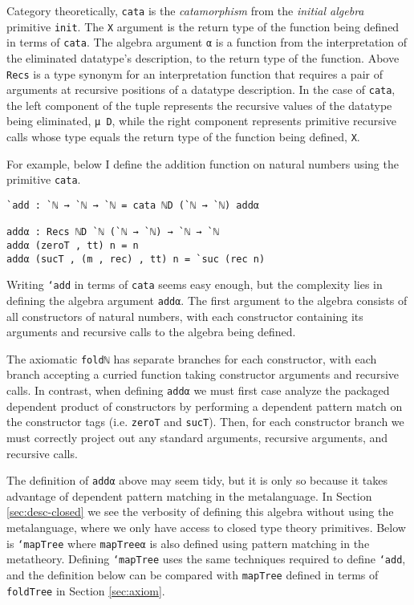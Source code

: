 \documentclass[runningheads,a4paper]{llncs}
\newcommand{\refsec}[1]{Section \ref{sec:#1}}
\begin{document}
Category theoretically, {\tt cata} is the {\it catamorphism} from the
{\it initial algebra} primitive {\tt init}. The {\tt X} argument is
the return type of the function being defined in terms of {\tt cata}.
The algebra argument {\tt α} is a function from the interpretation of
the eliminated datatype's description, to the return type of the
function. Above {\tt Recs} is a type synonym for an interpretation
function that requires a pair of arguments at recursive positions of a
datatype description. In the case of {\tt cata}, the left component of
the tuple represents the recursive values of the datatype being
eliminated, {\tt μ D}, while the right component represents primitive
recursive calls whose type equals the return type of the function
being defined, {\tt X}.

For example, below I define the addition function on natural numbers
using the primitive {\tt cata}.

\begin{verbatim}
`add : `ℕ → `ℕ → `ℕ = cata ℕD (`ℕ → `ℕ) addα

addα : Recs ℕD `ℕ (`ℕ → `ℕ) → `ℕ → `ℕ
addα (zeroT , tt) n = n
addα (sucT , (m , rec) , tt) n = `suc (rec n)
\end{verbatim}

Writing {\tt `add} in terms of {\tt cata} seems easy enough, but the
complexity lies in defining the algebra argument {\tt addα}. The first
argument to the algebra consists of all constructors of natural
numbers, with each constructor containing its arguments and recursive
calls to the algebra being defined.

The axiomatic {\tt foldℕ}
has separate branches for each constructor, with each branch accepting
a curried function taking constructor arguments and recursive calls.
In contrast, when defining {\tt addα} we must first case analyze the
packaged dependent product of constructors by performing a dependent
pattern match on the constructor tags
(i.e. {\tt zeroT} and {\tt sucT}). Then, for each constructor branch
we must correctly project out any standard arguments, recursive
arguments, and recursive calls.

The definition of {\tt addα} above
may seem tidy, but it is only so because it takes advantage of
dependent pattern matching in the metalanguage. In \refsec{desc-closed}
we see the verbosity of defining this algebra without using the
metalanguage, where we only have access to closed type theory
primitives. Below is {\tt `mapTree} where {\tt mapTreeα} is also defined
using pattern matching in the metatheory. Defining {\tt `mapTree} uses
the same techniques required to define {\tt `add}, and the definition
below can be compared with {\tt mapTree} defined in terms of
{\tt foldTree} in \refsec{axiom}. 
\end{document}
